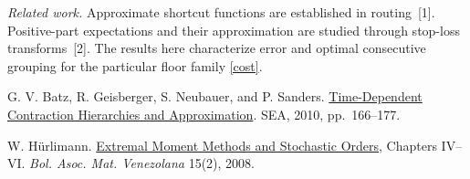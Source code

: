 \documentclass[11pt]{article}
\begin{document}
{\footnotesize
\textit{Related work.} Approximate shortcut functions are established in
routing~[1]. Positive-part expectations and their approximation are studied
through stop-loss transforms~[2]. The results here characterize error and
optimal consecutive grouping for the particular floor family \eqref{cost}.\par
[1] G. V. Batz, R. Geisberger, S. Neubauer, and P. Sanders.
\href{https://ae.iti.kit.edu/download/sea10_atch.pdf}{Time-Dependent
Contraction Hierarchies and Approximation}. SEA, 2010, pp.~166--177.\par
[2] W. H\"urlimann.
\href{https://www.kurims.kyoto-u.ac.jp/EMIS/journals/BAMV/conten/vol15/bamvXV-2.pdf}{Extremal
Moment Methods and Stochastic Orders}, Chapters IV--VI.
\textit{Bol. Asoc. Mat. Venezolana} 15(2), 2008.
}
\end{document}
